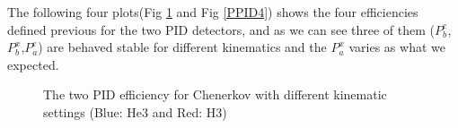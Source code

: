 The following four plots(Fig \ref{PPID3} and Fig \ref{PPID4}) shows the four efficiencies defined previous for the two PID detectors, and as we can see three of them ($P_{b}^{e}$,$P_{b}^{x}$,$P_{a}^{e}$) are behaved stable for different kinematics and the $P_{a}^{x}$ varies as what we expected.
\begin{figure}[htpb]


\caption{The two PID efficiency for Chenerkov with different kinematic settings (Blue: He3 and Red: H3)  }  \label{PPID3}
\end{figure}

